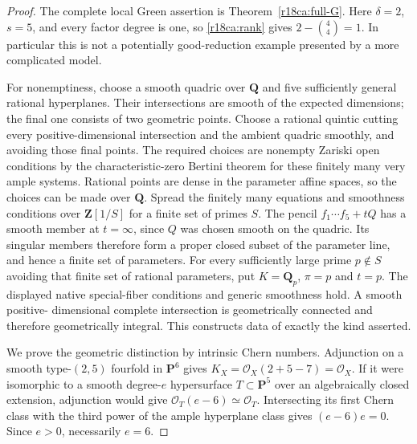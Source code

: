 \begin{proof}
The complete local Green assertion is
Theorem~\ref{r18ca:full-G}.  Here $\delta=2$, $s=5$,
and every factor degree is one, so
\eqref{r18ca:rank} gives $2-\binom44=1$.
In particular this is not a potentially good-reduction
example presented by a more complicated model.

For nonemptiness, choose a smooth quadric over $\mathbf Q$
and five sufficiently general rational hyperplanes.
Their intersections are smooth of the expected dimensions;
the final one consists of two geometric points.
Choose a rational quintic cutting every positive-dimensional
intersection and the ambient quadric smoothly, and avoiding
those final points.  The required choices are nonempty
Zariski open conditions by the characteristic-zero Bertini
theorem for these finitely many very ample systems.
Rational points are dense in the parameter affine spaces,
so the choices can be made over $\mathbf Q$.
Spread the finitely many equations and smoothness conditions
over $\mathbf Z[1/S]$ for a finite set of primes $S$.
The pencil $f_1\cdots f_5+tQ$ has a smooth member at
$t=\infty$, since $Q$ was chosen smooth on the quadric.
Its singular members therefore form a proper closed subset
of the parameter line, and hence a finite set of parameters.
For every sufficiently large prime $p\notin S$ avoiding
that finite set of rational parameters, put $K=\mathbf Q_p$,
$\pi=p$ and $t=p$.  The displayed native special-fiber
conditions and generic smoothness hold.  A smooth positive-
dimensional complete intersection is geometrically connected
and therefore geometrically integral.  This constructs data
of exactly the kind asserted.

We prove the geometric distinction by intrinsic Chern numbers.
Adjunction on a smooth type-$(2,5)$ fourfold in $\mathbf P^6$
gives $K_X=\mathcal O_X(2+5-7)=\mathcal O_X$.
If it were isomorphic to a smooth degree-$e$ hypersurface
$T\subset\mathbf P^5$ over an algebraically closed extension,
adjunction would give $\mathcal O_T(e-6)\simeq\mathcal O_T$.
Intersecting its first Chern class with the third power
of the ample hyperplane class gives $(e-6)e=0$.
Since $e>0$, necessarily $e=6$.


\end{proof}
